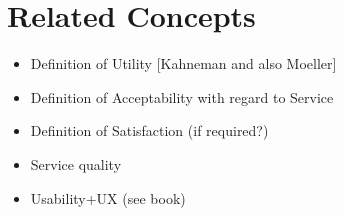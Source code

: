 \section{Related Concepts}
\begin{itemize}
\item Definition of Utility [Kahneman and also Moeller]
\item Definition of Acceptability with regard to Service
\item Definition of Satisfaction (if required?)
\item Service quality
\item Usability+UX (see book)
\end{itemize}